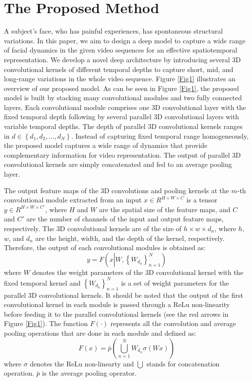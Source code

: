 \documentclass[a4paper,conference]{IEEEtran}
\begin{document}
\section{The Proposed Method}
\label{Method}
A subject's face, who has painful experiences, has spontaneous structural variations. In this paper, we aim to design a deep model to capture a wide range of facial dynamics in the given video sequences for an effective spatiotemporal representation. %
We develop a novel deep architecture by introducing several 3D convolutional kernels of different temporal depths to capture short, mid, and long-range variations in the whole video sequence. Figure \ref{Fig1} illustrates an overview of our proposed model. As can be seen in Figure \ref{Fig1}, the proposed model is built by stacking many convolutional modules and two fully connected layers. Each convolutional module comprises one 3D convolutional layer with the fixed temporal depth following by several parallel 3D convolutional layers with variable temporal depths. The depth of parallel 3D convolutional kernels ranges in $d\in \left\{ {{d}_{1}},{{d}_{2}},\ldots ,{{d}_{N}} \right\}$. Instead of capturing fixed temporal range homogeneously, the proposed model captures a wide range of dynamics that provide complementary information for video representation. The output of parallel 3D convolutional kernels are simply concatenated and fed to an average pooling layer.

The output feature maps of the 3D convolutions and pooling kernels at the $m$-th convolutional module extracted from an input $x\in {{R}^{H\times W\times C}}$ is a tensor $y\in {{R}^{H\times W\times {C}'}}$, where $H$ and $W$ are the spatial size of the feature maps, and $C$ and $C'$ are the number of channels of the input and output feature maps, respectively. The 3D convolutional kernels are of the size of $h\times w\times {d}_{n}$, where $h$, $w$, and ${d}_{n}$ are the height, width, and the depth of the kernel, respectively. Therefore, the output of each convolutional modules is obtained as:
\begin{equation}
y=F\left( x\left| W,\left\{ {{W}_{{{d}_{n}}}} \right\}_{n=1}^{N} \right. \right)
\end{equation}
where $W$ denotes the weight parameters of the 3D convolutional kernel with the fixed temporal kernel and $\left\{ {{W}_{{{d}_{n}}}} \right\}_{n=1}^{N}$ is a set of weight parameters for the parallel 3D convolutional kernels. It should be noted that the output of the first convolutional kernel in each module is passed through a ReLu non-linearity before feeding it to the parallel convolutional kernels (see the red arrows in Figure \ref{Fig1}). The function $F\left( \cdot  \right)$ represents all the convolution and average pooling operations that are done in each module and defined as:
\begin{equation}
F\left( x \right)=\bar{p}\left( \bigcup\limits_{n=1}^{N}{{{W}_{{{d}_{n}}}}}\sigma \left( Wx \right) \right)
\end{equation}
where $\sigma$ denotes the ReLu non-linearty and $\bigcup{{}}$ stands for concatenation operation. $\bar{p}$ is the average pooling operator.
\end{document}
